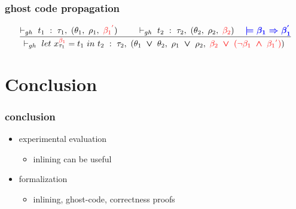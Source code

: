 \begin{frame}
\frametitle{ghost code propagation}
\begin{footnotesize}	
\begin{displaymath}
\begin{array}{l}
\dfrac
	{
		\vdash_{gh}~t_1~:~\tau_1,~(\theta_1,~\rho_1,~\textcolor{red}{\textcolor{red}{\beta_{1}}^{\textcolor{red}{'}}})~\textcolor{blue}{\boldsymbol{}} \qquad
		\vdash_{gh}~t_2~:~\tau_2,~(\theta_2,~\rho_2,~\textcolor{red}{\textcolor{red}{\beta_{2}}})~\textcolor{blue}{\boldsymbol{  \quad \models \beta_{1} \Rightarrow \beta_{1}^{'}}}
	}
	{\vdash_{gh}~let~x^{\textcolor{red}{\beta_{1}}}_{\tau_1} = t_1~in~t_2~:~\tau_2,~(\theta_1 \boldsymbol{~\vee~} \theta_2,~\rho_1 \boldsymbol{~\vee~} \rho_2,~\textcolor{red}{\textcolor{red}{\beta_{2}} \boldsymbol{~\vee~} (\textcolor{red}{\neg\beta_{1}} \boldsymbol{~\wedge~} \textcolor{red}{\beta_{1}}^{\textcolor{red}{'}})})~\textcolor{blue}{\boldsymbol{}}}
	{}
	\end{array}	
\end{displaymath}
\end{footnotesize}	
\end{frame}

\section*{Conclusion}
\begin{frame}
\frametitle{conclusion}
\begin{itemize}
\item experimental evaluation 
\begin{itemize}
	\item inlining can be useful 
\end{itemize}
\item formalization
\begin{itemize}
	\item inlining, ghost-code, correctness proofs
\end{itemize}
\end{itemize}
\end{frame}
%	

	






